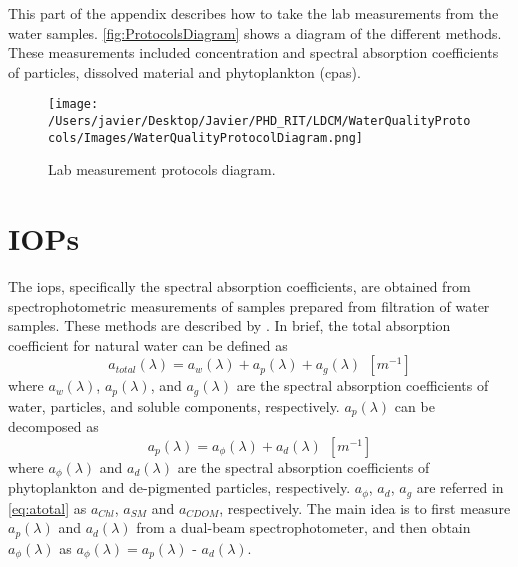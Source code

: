 \begin{appendices}
This part of the appendix describes how to take the lab measurements from the water samples. \autoref{fig:ProtocolsDiagram} shows a diagram of the different methods. These measurements included concentration and spectral absorption coefficients of particles, dissolved material and phytoplankton (\gls{cpas}).


\begin{figure}[htb]
\centering
    \texttt{[image: /Users/javier/Desktop/Javier/PHD\_RIT/LDCM/WaterQualityProtocols/Images/WaterQualityProtocolDiagram.png]}%
    \vspace{0.5cm}
   \caption[]{\label{fig:ProtocolsDiagram} Lab measurement protocols diagram.}
\end{figure}

\section{IOPs}
The \gls{iops}, specifically the spectral absorption coefficients, are obtained from spectrophotometric measurements of samples prepared from filtration of water samples. These methods are described by \cite{Mitchell2002}. In brief, the total absorption coefficient for natural water can be defined as \cite{Mitchell2002}
\begin{equation}
  a_{total}(\lambda) = a_w(\lambda) + a_p(\lambda) + a_g(\lambda)~~[m^{-1}] 
\end{equation}
\noindent where $a_w(\lambda)$, $a_p(\lambda)$, and $a_g(\lambda)$ are the spectral absorption coefficients of water, particles, and soluble components, respectively. $a_p(\lambda)$ can be decomposed as
\begin{equation}
  a_p(\lambda) = a_\phi(\lambda) + a_d(\lambda)~~[m^{-1}] 
\end{equation}
\noindent where $a_\phi(\lambda)$ and $a_d(\lambda)$ are the spectral absorption coefficients of phytoplankton and de-pigmented particles, respectively. $a_\phi$, $a_d$, $a_g$ are referred in \autoref{eq:atotal} as $a_{Chl}$, $a_{SM}$ and $a_{CDOM}$, respectively. The main idea is to first measure $a_p(\lambda)$ and $a_d(\lambda)$ from a dual-beam spectrophotometer, and then obtain $a_\phi(\lambda)$ as $a_\phi(\lambda)=a_p(\lambda)$ - $a_d(\lambda)$.


\end{appendices}
